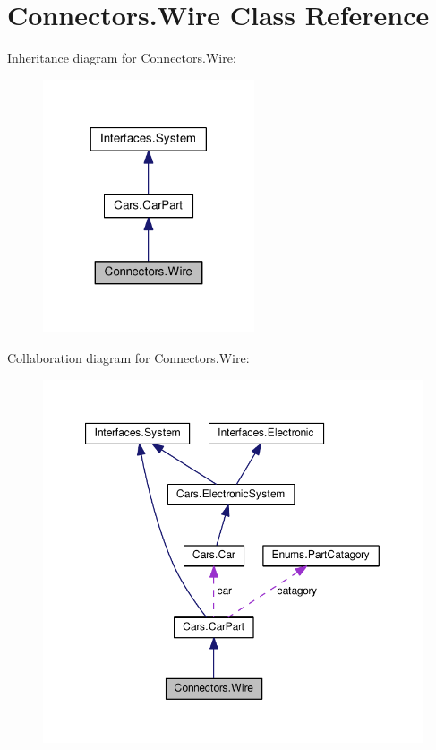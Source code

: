 \hypertarget{classConnectors_1_1Wire}{}\section{Connectors.\+Wire Class Reference}
\label{classConnectors_1_1Wire}


Inheritance diagram for Connectors.\+Wire\+:\nopagebreak
\begin{figure}[H]
\begin{center}
\leavevmode
\includegraphics[width=177pt]{classConnectors_1_1Wire__inherit__graph}
\end{center}
\end{figure}


Collaboration diagram for Connectors.\+Wire\+:\nopagebreak
\begin{figure}[H]
\begin{center}
\leavevmode
\includegraphics[width=350pt]{classConnectors_1_1Wire__coll__graph}
\end{center}
\end{figure}
